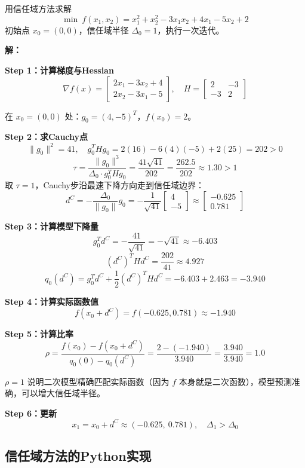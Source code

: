\begin{example}\label{ex:trust-region}
用信任域方法求解
\[
\min\ f(x_1, x_2) = x_1^2 + x_2^2 - 3x_1 x_2 + 4x_1 - 5x_2 + 2
\]
初始点 $x_0 = (0, 0)$，信任域半径 $\Delta_0 = 1$，执行一次迭代。

\textbf{解：}

\textbf{Step 1：计算梯度与Hessian}
\[
\nabla f(x) = \begin{bmatrix} 2x_1 - 3x_2 + 4 \\ 2x_2 - 3x_1 - 5 \end{bmatrix},\quad
H = \begin{bmatrix} 2 & -3 \\ -3 & 2 \end{bmatrix}
\]

在 $x_0 = (0, 0)$ 处：$g_0 = (4, -5)^T$，$f(x_0) = 2$。

\textbf{Step 2：求Cauchy点}
\[
\|g_0\|^2 = 41,\quad g_0^T H g_0 = 2(16) - 6(4)(-5) + 2(25) = 202 > 0
\]
\[
\tau = \frac{\|g_0\|^3}{\Delta_0 \cdot g_0^T H g_0} = \frac{41\sqrt{41}}{202} = \frac{262.5}{202} \approx 1.30 > 1
\]
取 $\tau = 1$，Cauchy步沿最速下降方向走到信任域边界：
\[
d^C = -\frac{\Delta_0}{\|g_0\|} g_0 = -\frac{1}{\sqrt{41}} \begin{bmatrix} 4 \\ -5 \end{bmatrix} \approx \begin{bmatrix} -0.625 \\ 0.781 \end{bmatrix}
\]

\textbf{Step 3：计算模型下降量}
\[
g_0^T d^C = -\frac{41}{\sqrt{41}} = -\sqrt{41} \approx -6.403
\]
\[
(d^C)^T H d^C = \frac{202}{41} \approx 4.927
\]
\[
q_0(d^C) = g_0^T d^C + \frac{1}{2}(d^C)^T H d^C = -6.403 + 2.463 = -3.940
\]

\textbf{Step 4：计算实际函数值}
\[
f(x_0 + d^C) = f(-0.625, 0.781) \approx -1.940
\]

\textbf{Step 5：计算比率}
\[
\rho = \frac{f(x_0) - f(x_0 + d^C)}{q_0(0) - q_0(d^C)} = \frac{2 - (-1.940)}{3.940} = \frac{3.940}{3.940} = 1.0
\]

$\rho = 1$ 说明二次模型精确匹配实际函数（因为 $f$ 本身就是二次函数），模型预测准确，可以增大信任域半径。

\textbf{Step 6：更新}
\[
x_1 = x_0 + d^C \approx (-0.625,\ 0.781),\quad \Delta_1 > \Delta_0
\]
\end{example}

\subsection{信任域方法的Python实现}\label{sec:trust-code}

